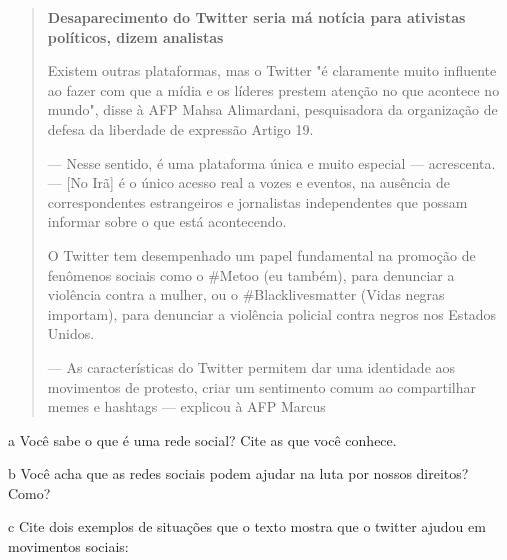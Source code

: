 
\begin{quote}
\textbf{Desaparecimento do Twitter seria má notícia para ativistas
políticos, dizem analistas }

Existem outras plataformas, mas o Twitter "é claramente muito influente
ao fazer com que a mídia e os líderes prestem atenção no que acontece no
mundo", disse à AFP Mahsa Alimardani, pesquisadora da organização de
defesa da liberdade de expressão Artigo 19.

--- Nesse sentido, é uma plataforma única e muito especial ---
acrescenta. --- {[}No Irã{]} é o único acesso real a vozes e eventos, na
ausência de correspondentes estrangeiros e jornalistas independentes que
possam informar sobre o que está acontecendo.

O Twitter tem desempenhado um papel fundamental na promoção de fenômenos
sociais como o \#Metoo (eu também), para denunciar a violência contra a
mulher, ou o \#Blacklivesmatter (Vidas negras importam), para denunciar
a violência policial contra negros nos Estados Unidos.

--- As características do Twitter permitem dar uma identidade aos
movimentos de protesto, criar um sentimento comum ao compartilhar memes
e hashtags --- explicou à AFP Marcus

\end{quote}

\num{a} Você sabe o que é uma rede social? Cite as que você conhece.


\num{b} Você acha que as redes sociais podem ajudar na luta por nossos direitos? Como?


\num{c} Cite dois exemplos de situações que o texto mostra que o twitter ajudou
em movimentos sociais:

